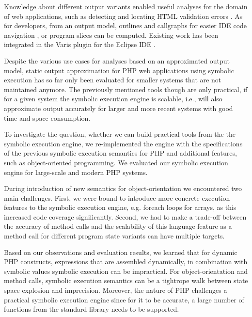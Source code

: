 \documentclass[preprint]{sig-alternate-05-2015}
\begin{document}

Knowledge about different output variants enabled useful analyses
for the domain of web applications, such as detecting and locating HTML
validation errors \cite{Nguyen:2011:AFH:2190078.2190142}. As for developers,
from an output model, outlines and callgraphs for easier IDE code navigation
\cite{Nguyen:2014:BCG:2635868.2635928}, or program slices
\cite{Nguyen:2015:CPS:2786805.2786872} can be computed. Existing work has been
integrated in the Varis plugin for the Eclipse IDE \cite{Nguyen:2015:VIS:2819009.2819140}.

Despite the various use cases for analyses based on an approximated output
model, static output approximation for PHP web applications using symbolic
execution has so far only been evaluated for smaller systems that are not
maintained anymore. The previously mentioned tools though are only practical, if
for a given system the symbolic execution engine is scalable, i.e., will also
approximate output accurately for larger and more recent systems with good time
and space consumption.

To investigate the question, whether we can build practical tools from the
the symbolic execution engine, we re-implemented the engine with the specifications
of the previous symbolic execution semantics
\cite{Nguyen:2014:BCG:2635868.2635928} for PHP and additional features, such as
object-oriented programming. We evaluated our
symbolic execution engine for large-scale and modern PHP systems.

During introduction of new semantics for object-orientation we encountered two
main challenges. First, we were bound to introduce more concrete execution features to the
symbolic execution engine, e.g. foreach loops for arrays, as this increased
code coverage significantly. Second, we had to make a trade-off between the
accuracy of method calls and the scalability of this language feature as a
method call for different program state variants can have multiple targets.

Based on our observations and evaluation results, we learned that for dynamic
PHP constructs, expressions that are assembled dynamically, in combination with
symbolic values symbolic execution can be impractical. For object-orientation
and method calls, symbolic execution semantics can be a tightrope walk between
state space explosion and imprecision. Moreover, the nature of PHP challenges a
practical symbolic execution engine since for it to be accurate, a large number
of functions from the standard library needs to be supported.
\end{document}
